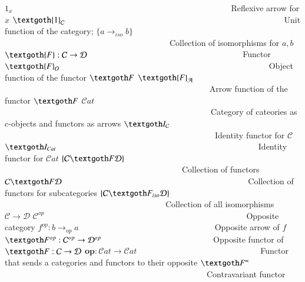 \documentclass [12pt]{book}
\begin{document}
$1_x$~~~~~~~~~~~~~~~~~~~~~~~~~~~~~~~~~~~~~~~~~~~~~~~~~~~~~Reflexive arrow for $x$\newline
$\textgoth{1}_\mathcal C$~~~~~~~~~~~~~~~~~~~~~~~~~~~~~~~~~~~~~~~~~~~~~~~~~~~~~Unit function of the category; \newline
$\{a\rightarrow_{iso}b\}$~~~~~~~~~~~~~~~~~~~~~~~~~~~~~~~~~~~~~~~~Collection of isomorphisms for $a,b$\newline
$\textgoth{F}:\mathcal{C}\rightarrow\mathcal{D}$~~~~~~~~~~~~~~~~~~~~~~~~~~~~~~~~~~~~~
Functor\newline
$\textgoth{F}_\mathcal O$~~~~~~~~~~~~~~~~~~~~~~~~~~~~~~~~~~~~~~~~~~~~~~~~~~
Object function of the functor $\textgoth F$\newline
$\textgoth{F}_\mathcal A$~~~~~~~~~~~~~~~~~~~~~~~~~~~~~~~~~~~~~~~~~~~~~~~~~
Arrow function of the functor $\textgoth F$\newline
$\mathcal Cat$~~~~~~~~~~~~~~~~~~~~~~~~~~~~~~~~~~~~~~~~~~~~~~~~~~Category of cateories as c-objects and functors as arrows\newline
$\textgoth I_\mathcal C$~~~~~~~~~~~~~~~~~~~~~~~~~~~~~~~~~~~~~~~~~~~~~~~~~~~Identity functor for $\mathcal C$\newline
$\textgoth I_{Cat}$~~~~~~~~~~~~~~~~~~~~~~~~~~~~~~~~~~~~~~~~~~~~~~~~~Identity functor for $\mathcal Cat$\newline
$\{\mathcal C\textgoth F\mathcal D\}$~~~~~~~~~~~~~~~~~~~~~~~~~~~~~~~~~~~~~~~~~~~Collection of functors\newline
$\mathcal C\textgoth F\mathcal D$~~~~~~~~~~~~~~~~~~~~~~~~~~~~~~~~~~~~~~~~~~~~~Collection of functors for subcategories\newline
$\{\mathcal C\textgoth F_{iso}\mathcal D\}$~~~~~~~~~~~~~~~~~~~~~~~~~~~~~~~~~~~~~~~Collection of all isomorphisms $\mathcal C\rightarrow\mathcal D$\newline
$\mathcal C^{op}$~~~~~~~~~~~~~~~~~~~~~~~~~~~~~~~~~~~~~~~~~~~~~~~~~Opposite category\newline
$f^{op}:b\rightarrow_{op}a$~~~~~~~~~~~~~~~~~~~~~~~~~~~~~~~~~Opposite arrow of $f$\newline
$\textgoth F^{op}:\mathcal C^{op}\rightarrow\mathcal D^{op}$~~~~~~~~~~~~~~~~~~~~~~~~~~~Opposite functor of $\textgoth F:\mathcal C\rightarrow\mathcal D$\newline
$\textbf{op}:\mathcal Cat\rightarrow\mathcal Cat$~~~~~~~~~~~~~~~~~~~~~~~~~~~~~~Functor that sends a categories and functors to their opposite\newline
$\textgoth F^{\ltimes}$~~~~~~~~~~~~~~~~~~~~~~~~~~~~~~~~~~~~~~~~~~~~~~~~~Contravariant functor\newline
\end{document}
